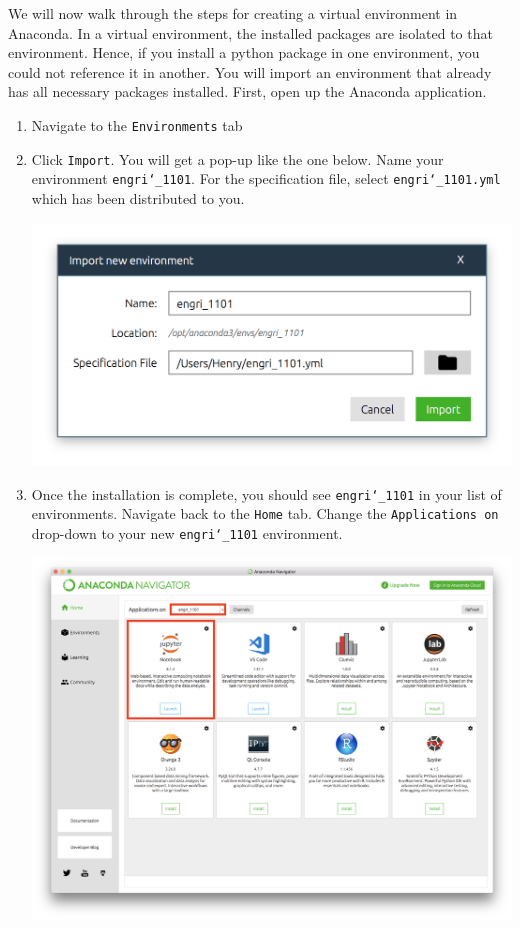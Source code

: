 \documentclass[11 pt]{article}
\begin{document}
We will now walk through the steps for creating a virtual environment in Anaconda. In a virtual environment, the installed packages are isolated to that environment. Hence, if you install a python package in one environment, you could not reference it in another. You will import an environment that already has all necessary packages installed. First, open up the Anaconda application.

\begin{enumerate}

\item Navigate to the \texttt{Environments} tab
\item Click \texttt{Import}. You will get a pop-up like the one below. Name your environment \texttt{engri\char`_1101}. For the specification file, select \texttt{engri\char`_1101.yml} which has been distributed to you. 

\begin{center}
\includegraphics[scale=0.4]{import_env}
\end{center}

\item Once the installation is complete, you should see \texttt{engri\char`_1101} in your list of environments. Navigate back to the \texttt{Home} tab. Change the \texttt{Applications on} drop-down to your new \texttt{engri\char`_1101} environment.

\begin{center}
\includegraphics[scale=0.3]{home_tab}
\end{center}


\end{enumerate}
\end{document}
